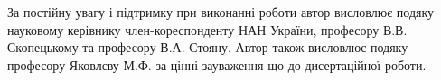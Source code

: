 За постійну увагу і підтримку при виконанні роботи автор висловлює  подяку науковому керівнику член-кореспонденту
НАН України, професору В.В. Скопецькому  та професору В.А. Стояну. Автор також висловлює подяку професору Яковлєву М.Ф.
за цінні зауваження що до дисертаційної роботи.